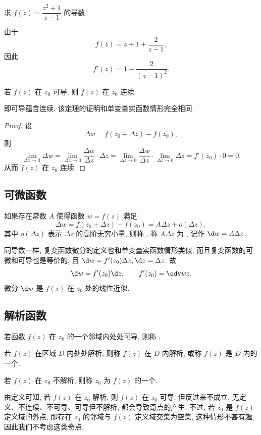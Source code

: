 \begin{example}
  求 $f(z)=\dfrac{z^2+1}{z-1}$ 的导数.
\end{example}
\begin{solution}
  由于
  \[
    f(z)=z+1+\frac2{z-1},
  \]
  因此
  \[
    f'(z)=1-\frac2{(z-1)^2}.
  \]
\end{solution}



\begin{theorem}
  若 $f(z)$ 在 $z_0$ 可导, 则 $f(z)$ 在 $z_0$ 连续.
\end{theorem}
即可导蕴含连续. 该定理的证明和单变量实函数情形完全相同.
\begin{proof}
  设
    \[\Delta w=f(z_0+\Delta z)-f(z_0),\]
  则
    \[
      \lim_{\Delta z\to 0}\Delta w
      =\lim_{\Delta z\to 0}\frac{\Delta w}{\Delta z}\cdot\Delta z
      =\lim_{\Delta z\to 0}\frac{\Delta w}{\Delta z}\cdot
        \lim_{\Delta z\to 0}\Delta z
      =f'(z_0)\cdot 0=0.
    \]
  从而 $f(z)$ 在 $z_0$ 连续.
\end{proof}


\subsection{可微函数}


\begin{definition}
  如果存在常数 $A$ 使得函数 $w=f(z)$ 满足
    \[\Delta w=f(z_0+\Delta z)-f(z_0)=A\Delta z+o(\Delta z),\]
  其中 $o(\Delta z)$ 表示 $\Delta z$ 的高阶无穷小量,
  则称 , 称 $A\Delta z$ 为 , 记作 $\d w=A \Delta z$.
\end{definition}

同导数一样, 复变函数微分的定义也和单变量实函数情形类似, 而且复变函数的可微和可导也是等价的, 且 $\d w=f'(z_0)\Delta z, \d z=\Delta z$.
故
  \[\d w=f'(z_0)\d z,\qquad f'(z_0)=\odv wz.\]
微分 $\d w$ 是 $f(z)$ 在 $z_0$ 处的线性近似.

\subsection{解析函数}

\begin{definition}
  \begin{enumpar}
    \item 若函数 $f(z)$ 在 $z_0$ 的一个邻域内处处可导, 则称 .
    \item 若 $f(z)$ 在区域 $D$ 内处处解析, 则称 $f(z)$ 在 $D$ 内解析, 或称 $f(z)$ 是 $D$ 内的一个.\footnotemark
    \item 若 $f(z)$ 在 $z_0$ 不解析, 则称 $z_0$ 为 $f(z)$ 的一个.
  \end{enumpar}
\end{definition}
由定义可知, 若 $f(z)$ 在 $z_0$ 解析, 则 $f(z)$ 在 $z_0$ 可导, 但反过来不成立.
无定义、不连续、不可导、可导但不解析, 都会导致奇点的产生.
不过, 若 $z_0$ 是 $f(z)$ 定义域的外点, 即存在 $z_0$ 的邻域与 $f(z)$ 定义域交集为空集, 这种情形不甚有趣, 因此我们不考虑这类奇点.

